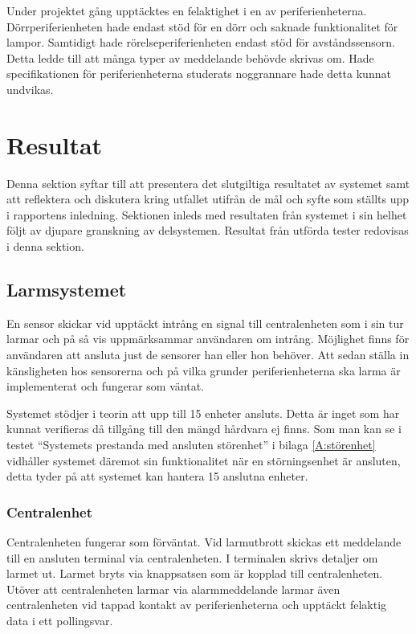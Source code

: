 \documentclass[a4paper]{article}
\begin{document}
Under projektet gång upptäcktes en felaktighet i en av periferienheterna.
Dörrperiferienheten hade endast stöd för en dörr och saknade funktionalitet för lampor.
Samtidigt hade rörelseperiferienheten endast stöd för avståndssensorn.
Detta ledde till att många typer av meddelande behövde skrivas om.
Hade specifikationen för periferienheterna studerats noggrannare hade detta kunnat undvikas.

\newpage
\section{Resultat}
Denna sektion syftar till att presentera det slutgiltiga resultatet av systemet samt att reflektera och diskutera kring utfallet utifrån de mål och syfte som ställts upp i rapportens inledning.
Sektionen inleds med resultaten från systemet i sin helhet följt av djupare granskning av delsystemen.
Resultat från utförda tester redovisas i denna sektion.

\subsection{Larmsystemet}
En sensor skickar vid upptäckt intrång en signal till centralenheten som i sin tur larmar och på så vis uppmärksammar användaren om intrång.
Möjlighet finns för användaren att ansluta just de sensorer han eller hon behöver.
Att sedan ställa in känsligheten hos sensorerna och på vilka grunder periferienheterna ska larma är implementerat och fungerar som väntat.

Systemet stödjer i teorin att upp till 15 enheter ansluts. Detta är inget som har kunnat verifieras då tillgång till den mängd hårdvara ej finns.
Som man kan se i testet ``Systemets prestanda med ansluten störenhet'' i bilaga \ref{A:störenhet} vidhåller systemet däremot sin funktionalitet när en störningsenhet är ansluten, detta tyder på att systemet kan hantera 15 anslutna enheter.

\subsubsection{Centralenhet}
Centralenheten fungerar som förväntat.
Vid larmutbrott skickas ett meddelande till en ansluten terminal via centralenheten.
I terminalen skrivs detaljer om larmet ut.
Larmet bryts via knappsatsen som är kopplad till centralenheten.
Utöver att centralenheten larmar via alarmmeddelande larmar även centralenheten vid tappad kontakt av periferienheterna och upptäckt felaktig data i ett pollingsvar.
\end{document}
